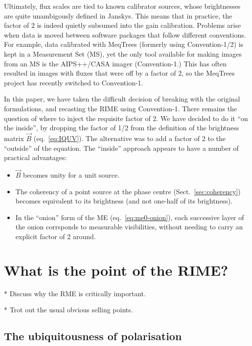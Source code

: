 \documentclass[]{aa}
\begin{document}
Ultimately, flux scales are tied to known calibrator sources, whose brightnesses are quite unambigously defined in Janskys. This means that in practice, the factor of 2 is indeed quietly subsumed into the gain calibration. Problems arise when data is moved between software packages that follow different conventions. For example, data calibrated with MeqTrees (formerly using 
Convention-1/2) is kept in a Measurement Set (MS), yet the only tool available for making images from an MS is the AIPS++/CASA imager (Convention-1.) This has often resulted in images with fluxes that were off by a factor of 2, so the MeqTrees project has recently switched to Convention-1.

In this paper, we have taken the difficult decision of breaking with the original formulations, and recasting the RIME using Convention-1. There remains the question of where to inject the requisite factor of 2. We have decided to do it ``on the inside'', by dropping the factor of 1/2 from the \citet{ME4} definition of the brightness matrix $\vec B$ (eq.~\ref{eq:IQUV}). The alternative was to add a factor of 2 to the ``outside'' of the equation. The ``inside'' approach appears to have a number of practical advantages:

\begin{itemize}
\item $\vec B$ becomes unity for a unit source.
\item The coherency of a point source at the phase centre (Sect.~\ref{sec:coherency}) becomes equivalent to its brightness (and not one-half of its brightness).
\item In the ``onion'' form of the ME (eq.~\ref{eq:me0-onion}), each successive layer of the onion corrsponds to measurable visibilities, without needing to carry an explicit factor of 2 around.
\end{itemize}

\section{\label{sec:what-is-the-point}What is the point of the RIME?}

* Discuss why the RME is critically important. 

* Trot out the usual obvious selling points.

\subsection{The ubiquitousness of polarisation}
\end{document}

